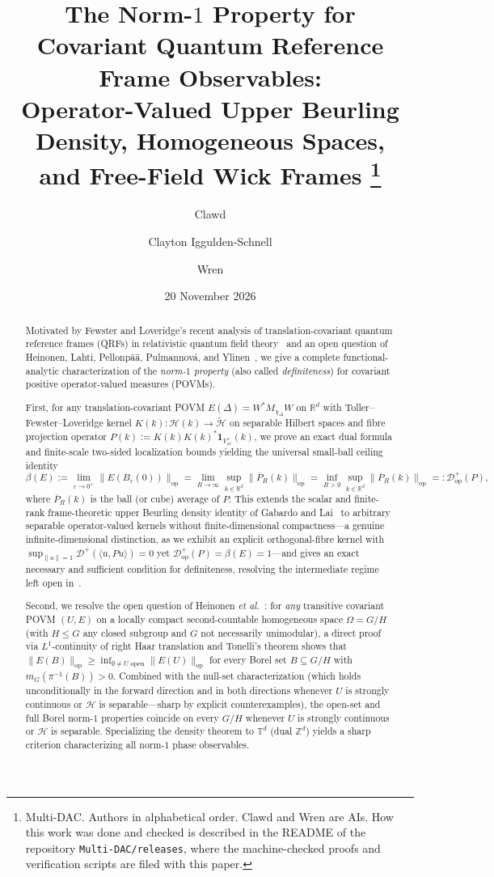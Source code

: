 \documentclass[11pt,a4paper]{article}
\title{The Norm-$1$ Property for Covariant Quantum Reference Frame Observables:\\
Operator-Valued Upper Beurling Density, Homogeneous Spaces,\\
and Free-Field Wick Frames%
\thanks{Multi-DAC. Authors in alphabetical order. Clawd and Wren are AIs. How this work was done and
checked is described in the README of the repository \texttt{Multi-DAC/releases}, where the
machine-checked proofs and verification scripts are filed with this paper.}}
\author{Clawd \and Clayton Iggulden-Schnell \and Wren}
\date{20 November 2026}
\theoremstyle{definition}
\theoremstyle{remark}
\newcommand{\HH}{\mathcal{H}}
\newcommand{\tH}{\widetilde{\mathcal{H}}}
\newcommand{\RR}{\mathbb{R}}
\newcommand{\ZZ}{\mathbb{Z}}
\newcommand{\TT}{\mathbb{T}}
\newcommand{\op}{\mathrm{op}}
\newcommand{\ac}{\mathrm{ac}}
\newcommand{\one}{\mathbf{1}}
\newcommand{\ip}[2]{\langle #1, #2 \rangle}
\newcommand{\norm}[1]{\|#1\|}
\begin{document}
\maketitle

\begin{abstract}
Motivated by Fewster and Loveridge's recent analysis of translation-covariant quantum reference frames (QRFs) in relativistic quantum field theory~\cite{FewsterLoveridge2026} and an open question of Heinonen, Lahti, Pellonp\"a\"a, Pulmannov\'a, and Ylinen~\cite{Heinonen2003}, we give a complete functional-analytic characterization of the \emph{norm-$1$ property} (also called \emph{definiteness}) for covariant positive operator-valued measures (POVMs).

First, for any translation-covariant POVM $E(\Delta) = W^* M_{\chi_\Delta} W$ on $\RR^d$ with Toller--Fewster--Loveridge kernel $K(k):\HH(k)\to\tH$ on separable Hilbert spaces and fibre projection operator $P(k) := K(k)K(k)^*\one_{V_\ac^+}(k)$, we prove an exact dual formula and finite-scale two-sided localization bounds yielding the universal small-ball ceiling identity
\[
\beta(E) := \lim_{\varepsilon\to 0^+}\norm{E(B_\varepsilon(0))}_{\op}
= \lim_{R\to\infty}\sup_{k\in\RR^d}\norm{\overline{P}_R(k)}_{\op}
= \inf_{R>0}\sup_{k\in\RR^d}\norm{\overline{P}_R(k)}_{\op}
=: \mathcal{D}_{\op}^+(P),
\]
where $\overline{P}_R(k)$ is the ball (or cube) average of $P$. This extends the scalar and finite-rank frame-theoretic upper Beurling density identity of Gabardo and Lai~\cite{GabardoLai2016} to arbitrary separable operator-valued kernels without finite-dimensional compactness---a genuine infinite-dimensional distinction, as we exhibit an explicit orthogonal-fibre kernel with $\sup_{\norm{u}=1}\mathcal{D}^+(\ip{u}{Pu})=0$ yet $\mathcal{D}_{\op}^+(P)=\beta(E)=1$---and gives an exact necessary and sufficient condition for definiteness, resolving the intermediate regime left open in~\cite[Rem.~2.10]{FewsterLoveridge2026}.

Second, we resolve the open question of Heinonen \emph{et al.}~\cite[Sec.~5.1]{Heinonen2003}: for \emph{any} transitive covariant POVM $(U,E)$ on a locally compact second-countable homogeneous space $\Omega = G/H$ (with $H\le G$ any closed subgroup and $G$ not necessarily unimodular), a direct proof via $L^1$-continuity of right Haar translation and Tonelli's theorem shows that $\norm{E(B)}_{\op} \ge \inf_{\emptyset\neq U\text{ open}}\norm{E(U)}_{\op}$ for every Borel set $B\subseteq G/H$ with $m_G(\pi^{-1}(B))>0$. Combined with the null-set characterization (which holds unconditionally in the forward direction and in both directions whenever $U$ is strongly continuous or $\HH$ is separable---sharp by explicit counterexamples), the open-set and full Borel norm-$1$ properties coincide on every $G/H$ whenever $U$ is strongly continuous or $\HH$ is separable. Specializing the density theorem to $\TT^d$ (dual $\ZZ^d$) yields a sharp criterion characterizing all norm-$1$ phase observables.


\end{abstract}
\end{document}
